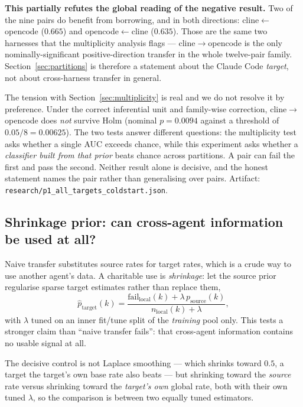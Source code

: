 \documentclass[11pt]{article}
\begin{document}
\textbf{This partially refutes the global reading of the negative result.}
Two of the nine pairs do benefit from borrowing, and in both directions:
cline$\leftarrow$opencode ($0.665$) and opencode$\leftarrow$cline ($0.635$).
Those are the same two harnesses that the multiplicity analysis flags ---
cline$\to$opencode is the only nominally-significant positive-direction
transfer in the whole twelve-pair family. Section~\ref{sec:partitions} is
therefore a statement about the Claude Code \emph{target}, not about
cross-harness transfer in general.

The tension with Section~\ref{sec:multiplicity} is real and we do not resolve it
by preference. Under the correct inferential unit and family-wise correction,
cline$\to$opencode does \emph{not} survive Holm (nominal $p = 0.0094$ against a
threshold of $0.05/8 = 0.00625$). The two tests answer different questions: the
multiplicity test asks whether a single AUC exceeds chance, while this
experiment asks whether a \emph{classifier built from that prior} beats chance
across partitions. A pair can fail the first and pass the second. Neither result
alone is decisive, and the honest statement names the pair rather than
generalising over pairs. Artifact:
\texttt{research/p1\_all\_targets\_coldstart.json}.

\subsection{Shrinkage prior: can cross-agent information be used at all?}
\label{sec:shrinkage}

Naive transfer substitutes source rates for target rates, which is a crude way
to use another agent's data. A charitable use is \emph{shrinkage}: let the
source prior regularise sparse target estimates rather than replace them,
\begin{equation}
\hat{p}_{\text{target}}(k) = \frac{\mathrm{fail}_{\text{local}}(k) + \lambda\,
p_{\text{source}}(k)}{n_{\text{local}}(k) + \lambda},
\end{equation}
with $\lambda$ tuned on an inner fit/tune split of the \emph{training} pool
only. This tests a stronger claim than ``naive transfer fails'': that
cross-agent information contains no usable signal at all.

The decisive control is not Laplace smoothing --- which shrinks toward $0.5$, a
target the target's own base rate also beats --- but shrinking toward the
\emph{source} rate versus shrinking toward the \emph{target's own} global rate,
both with their own tuned $\lambda$, so the comparison is between two equally
tuned estimators.
\end{document}
